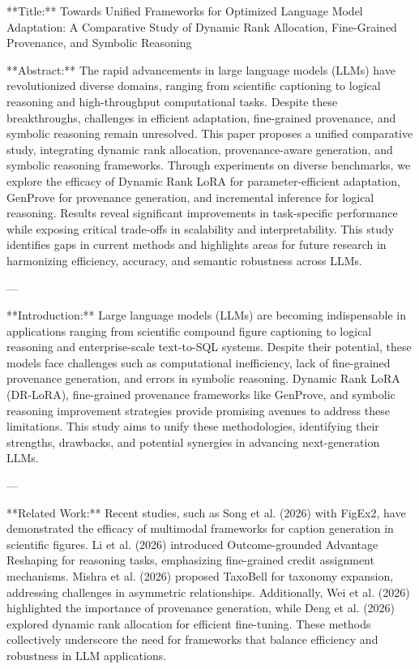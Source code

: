 **Title:**  
Towards Unified Frameworks for Optimized Language Model Adaptation: A Comparative Study of Dynamic Rank Allocation, Fine-Grained Provenance, and Symbolic Reasoning

**Abstract:**  
The rapid advancements in large language models (LLMs) have revolutionized diverse domains, ranging from scientific captioning to logical reasoning and high-throughput computational tasks. Despite these breakthroughs, challenges in efficient adaptation, fine-grained provenance, and symbolic reasoning remain unresolved. This paper proposes a unified comparative study, integrating dynamic rank allocation, provenance-aware generation, and symbolic reasoning frameworks. Through experiments on diverse benchmarks, we explore the efficacy of Dynamic Rank LoRA for parameter-efficient adaptation, GenProve for provenance generation, and incremental inference for logical reasoning. Results reveal significant improvements in task-specific performance while exposing critical trade-offs in scalability and interpretability. This study identifies gaps in current methods and highlights areas for future research in harmonizing efficiency, accuracy, and semantic robustness across LLMs.

---

**Introduction:**  
Large language models (LLMs) are becoming indispensable in applications ranging from scientific compound figure captioning to logical reasoning and enterprise-scale text-to-SQL systems. Despite their potential, these models face challenges such as computational inefficiency, lack of fine-grained provenance generation, and errors in symbolic reasoning. Dynamic Rank LoRA (DR-LoRA), fine-grained provenance frameworks like GenProve, and symbolic reasoning improvement strategies provide promising avenues to address these limitations. This study aims to unify these methodologies, identifying their strengths, drawbacks, and potential synergies in advancing next-generation LLMs.

---

**Related Work:**  
Recent studies, such as Song et al. (2026) with FigEx2, have demonstrated the efficacy of multimodal frameworks for caption generation in scientific figures. Li et al. (2026) introduced Outcome-grounded Advantage Reshaping for reasoning tasks, emphasizing fine-grained credit assignment mechanisms. Mishra et al. (2026) proposed TaxoBell for taxonomy expansion, addressing challenges in asymmetric relationships. Additionally, Wei et al. (2026) highlighted the importance of provenance generation, while Deng et al. (2026) explored dynamic rank allocation for efficient fine-tuning. These methods collectively underscore the need for frameworks that balance efficiency and robustness in LLM applications.

